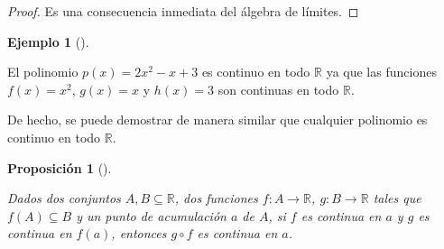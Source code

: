 \documentclass[
  a4paper,
]{scrreport}
\theoremstyle{plain}
\theoremstyle{plain}
\newtheorem{proposition}{Proposición}[chapter]
\theoremstyle{definition}
\theoremstyle{definition}
\newtheorem{example}{Ejemplo}[chapter]
\theoremstyle{plain}
\theoremstyle{remark}
\begin{document}
\begin{tcolorbox}[enhanced jigsaw, breakable, bottomrule=.15mm, coltitle=black, bottomtitle=1mm, opacityback=0, title=\textcolor{quarto-callout-note-color}{\faInfo}\hspace{0.5em}{Demostración}, left=2mm, toptitle=1mm, toprule=.15mm, opacitybacktitle=0.6, colframe=quarto-callout-note-color-frame, arc=.35mm, colback=white, rightrule=.15mm, titlerule=0mm, leftrule=.75mm, colbacktitle=quarto-callout-note-color!10!white]

\begin{proof}

Es una consecuencia inmediata del álgebra de límites.

\end{proof}

\end{tcolorbox}

\leavevmode{}%
\begin{example}[]\label{exm-continuidad-polinomios}

El polinomio \(p(x)=2x^2-x+3\) es continuo en todo \(\mathbb{R}\) ya que
las funciones \(f(x)=x^2\), \(g(x)=x\) y \(h(x)=3\) son continuas en
todo \(\mathbb{R}\).

De hecho, se puede demostrar de manera similar que cualquier polinomio
es continuo en todo \(\mathbb{R}\).

\end{example}

\leavevmode{}%
\begin{proposition}[]\label{prp-continuidad-composicion-funciones}

Dados dos conjuntos \(A,B\subseteq \mathbb{R}\), dos funciones
\(f:A\to \mathbb{R}\), \(g:B\to \mathbb{R}\) tales que
\(f(A)\subseteq B\) y un punto de acumulación \(a\) de \(A\), si \(f\)
es continua en \(a\) y \(g\) es continua en \(f(a)\), entonces
\(g\circ f\) es continua en \(a\).

\end{proposition}
\end{document}
